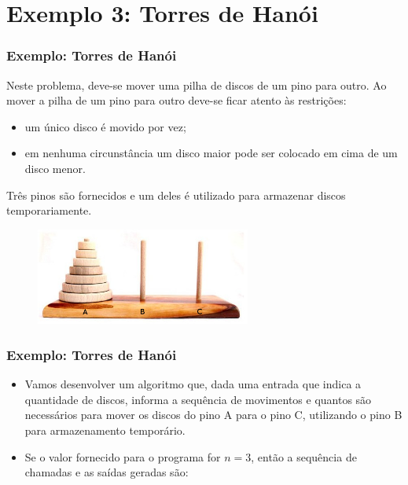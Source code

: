 \documentclass[aspectratio=169]{beamer}
\begin{document}
\section{Exemplo 3: Torres de Hanói} 

\begin{frame}
\frametitle{Exemplo: Torres de Hanói}
  Neste problema, deve-se mover uma pilha de discos de um pino para outro.
  Ao mover a pilha de um pino para outro deve-se ficar atento às restrições:
  \begin{itemize}
   \item um único disco é movido por vez;
   \item em nenhuma circunstância um disco maior pode ser colocado em cima de um disco menor.
  \end{itemize}
  Três pinos são fornecidos e um deles é utilizado para armazenar discos temporariamente.
\begin{figure}[!h]
  \centering
  \includegraphics[width=200pt]{imgs/torre_hanoi.png}
  \label{fig_torre_hanoi1}
\end{figure}
\end{frame}


\begin{frame}
\frametitle{Exemplo: Torres de Hanói}
  \begin{itemize}
  \item Vamos desenvolver um algoritmo que, dada uma entrada que indica a quantidade de discos, informa a sequência de movimentos e quantos são necessários para mover os discos do pino A para o pino C, utilizando o pino B para armazenamento temporário. 
  \item Se o valor fornecido para o programa for $n = 3$, então a sequência de chamadas e as saídas geradas são:  
  \end{itemize}
\end{frame}

\end{document}
